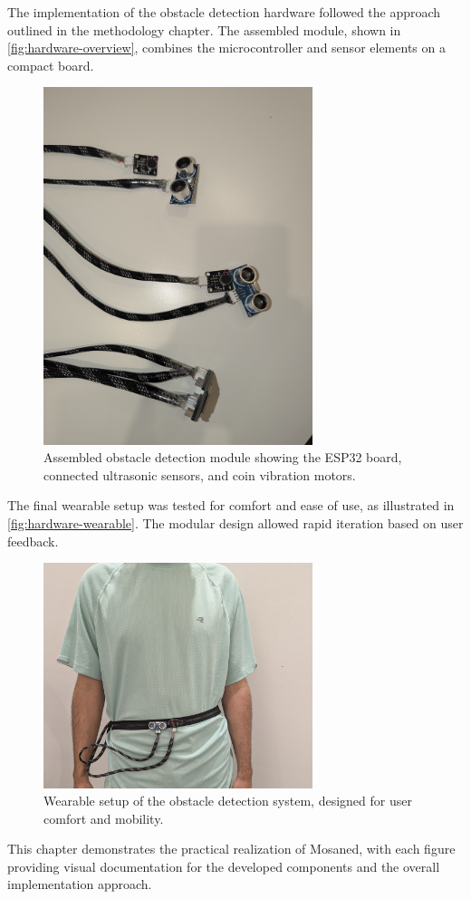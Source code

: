 The implementation of the obstacle detection hardware followed the approach outlined in the methodology chapter. The assembled module, shown in \autoref{fig:hardware-overview}, combines the microcontroller and sensor elements on a compact board.
\begin{figure}[h]
	\centering
	\includegraphics[width=0.7\textwidth]{assets/ch5_imp/obstacle_detection.jpg}
	\caption{Assembled obstacle detection module showing the ESP32 board, connected ultrasonic sensors, and coin vibration motors.}
	\label{fig:hardware-overview}
\end{figure}

The final wearable setup was tested for comfort and ease of use, as illustrated in \autoref{fig:hardware-wearable}. The modular design allowed rapid iteration based on user feedback.
\begin{figure}[h]
	\centering
	\includegraphics[width=0.7\textwidth]{assets/ch5_imp/obstac_weared.jpg}
	\caption{Wearable setup of the obstacle detection system, designed for user comfort and mobility.}
	\label{fig:hardware-wearable}
\end{figure}

\bigskip

This chapter demonstrates the practical realization of Mosaned, with each figure providing visual documentation for the developed components and the overall implementation approach.
